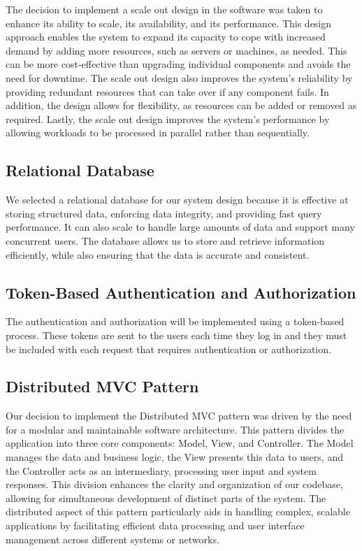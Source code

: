 \documentclass{Configuration_Files/Template}
\begin{document}
The decision to implement a scale out design in the software was taken to enhance its ability to scale, its availability, and its performance. This design approach enables the system to expand its capacity to cope with increased demand by adding more resources, such as servers or machines, as needed. This can be more cost-effective than upgrading individual components and avoids the need for downtime. The scale out design also improves the system’s reliability by providing redundant resources that can take over if
any component fails. In addition, the design allows for flexibility, as resources can be added or removed as required. Lastly, the scale out design improves the system’s performance by allowing workloads to be processed in parallel rather than sequentially.

\subsection{Relational Database}

We selected a relational database for our system design because it is effective at storing structured data, enforcing data integrity, and providing fast query performance. It can also scale to handle large amounts of data and support many concurrent users. The database allows us to store and retrieve information efficiently, while also ensuring that the data is accurate and consistent.

\subsection{Token-Based Authentication and Authorization}

The authentication and authorization will be implemented using a token-based process. These tokens are sent to the users each time they log in and they must be included with each request that requires authentication or authorization.

\subsection{Distributed MVC Pattern}

Our decision to implement the Distributed MVC pattern was driven by the need for a modular and maintainable software architecture. This pattern divides the application into three core components: Model, View, and Controller. The Model manages the data and business logic, the View presents this data to users, and the Controller acts as an intermediary, processing user input and system responses. This division enhances the clarity and organization of our codebase, allowing for simultaneous development of distinct parts of the system. The distributed aspect of this pattern particularly aids in handling complex, scalable applications by facilitating efficient data processing and user interface management across different systems or networks.
\end{document}

